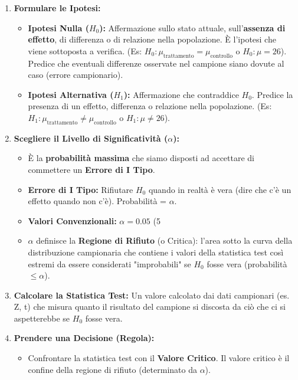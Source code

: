 \documentclass[12pt, a4paper]{article}
\newcommand{\popmean}{\mu} %
\newcommand{\alphaerr}{\alpha} %
\newcommand{\Hnull}{H_0} %
\newcommand{\Halt}{H_1} %
\begin{document}
\begin{enumerate}
    \item \textbf{Formulare le Ipotesi:}
        \begin{itemize}
            \item \textbf{Ipotesi Nulla ($\Hnull$):} Affermazione sullo stato attuale, sull'\textbf{assenza di effetto}, di differenza o di relazione nella popolazione. È l'ipotesi che viene sottoposta a verifica. (Es: $\Hnull: \popmean_{\text{trattamento}} = \popmean_{\text{controllo}}$ o $\Hnull: \popmean = 26$). Predice che eventuali differenze osservate nel campione siano dovute al caso (errore campionario).
            \item \textbf{Ipotesi Alternativa ($\Halt$):} Affermazione che contraddice $\Hnull$. Predice la presenza di un effetto, differenza o relazione nella popolazione. (Es: $\Halt: \popmean_{\text{trattamento}} \neq \popmean_{\text{controllo}}$ o $\Halt: \popmean \neq 26$).
        \end{itemize}
    \item \textbf{Scegliere il Livello di Significatività ($\alphaerr$):}
        \begin{itemize}
            \item È la \textbf{probabilità massima} che siamo disposti ad accettare di commettere un \textbf{Errore di I Tipo}.
            \item \textbf{Errore di I Tipo:} Rifiutare $\Hnull$ quando in realtà è vera (dire che c'è un effetto quando non c'è). Probabilità = $\alphaerr$.
            \item \textbf{Valori Convenzionali:} $\alphaerr = 0.05$ (5%
            \item $\alphaerr$ definisce la \textbf{Regione di Rifiuto} (o Critica): l'area sotto la curva della distribuzione campionaria che contiene i valori della statistica test così estremi da essere considerati "improbabili" se $\Hnull$ fosse vera (probabilità $\le \alphaerr$).
        \end{itemize}
    \item \textbf{Calcolare la Statistica Test:} Un valore calcolato dai dati campionari (es. Z, t) che misura quanto il risultato del campione si discosta da ciò che ci si aspetterebbe se $\Hnull$ fosse vera.
    \item \textbf{Prendere una Decisione (Regola):}
        \begin{itemize}
            \item Confrontare la statistica test con il \textbf{Valore Critico}. Il valore critico è il confine della regione di rifiuto (determinato da $\alphaerr$).

\end{itemize}
\end{enumerate}
\end{document}
